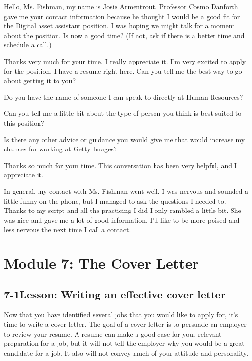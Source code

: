 Hello, Ms. Fishman, my name is Josie Armentrout. Professor Cosmo Danforth gave me your contact information because he thought I would be a good fit for the Digital asset assistant position. I was hoping we might talk for a moment about the position. Is now a good time? (If not, ask if there is a better time and schedule a call.)

Thanks very much for your time. I really appreciate it. I'm very excited to apply for the position. I have a resume right here. Can you tell me the best way to go about getting it to you?

Do you have the name of someone I can speak to directly at Human Resources?

Can you tell me a little bit about the type of person you think is best suited to this position?

Is there any other advice or guidance you would give me that would increase my chances for working at Getty Images?

Thanks so much for your time. This conversation has been very helpful, and I appreciate it.

In general, my contact with Ms. Fishman went well. I was nervous and sounded a little funny on the phone, but I managed to ask the questions I needed to. Thanks to my script and all the practicing I did I only rambled a little bit. She was nice and gave me a lot of good information. I'd like to be more poised and less nervous the next time I call a contact.


\pagebreak \section*{Module 7:	The Cover Letter}
\noindent\makebox[\textwidth]{\rule{\linewidth}{0.4pt}}  \localtableofcontents
\noindent\makebox[\textwidth]{\rule{\linewidth}{0.4pt}}


\pagebreak \subsection*{7-1\quad Lesson: Writing an effective cover letter}
Now that you have identified several jobs that you would like to apply for, it's time to write a cover letter. The goal of a cover letter is to persuade an employer to review your resume. A resume can make a good case for your relevant preparation for a job, but it will not tell the employer why you would be a great candidate for a job. It also will not convey much of your attitude and personality.

